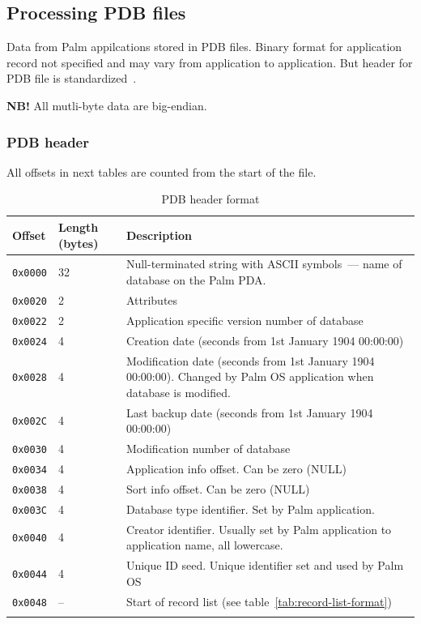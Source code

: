 \documentclass[a4paper,12pt,oneside]{scrartcl}
\begin{document}
\subsection{Processing PDB files}
\label{sec:parsing-pdb-files}

Data from Palm appilcations stored in PDB files. Binary format for application
record not specified and may vary from application to application. But header
for PDB file is standardized~\cite{PalmFileFormatSpec}.

\textbf{NB!} All mutli-byte data are big-endian.

\subsubsection{PDB header}
\label{sec:pdb-header}

All offsets in next tables are counted from the start of the file.

\begin{longtable}{|p{2cm}|p{4cm}|p{7cm}|}
  \hline
  \textbf{Offset} & \textbf{Length (bytes)} & \textbf{Description} \\
  \hline
  \texttt{0x0000} & 32 & Null-terminated string with ASCII symbols~--- name of database on the Palm PDA. \\
  \hline
  \texttt{0x0020} & 2 & Attributes \\
  \hline
  \texttt{0x0022} & 2 & Application specific version number of database \\
  \hline
  \texttt{0x0024} & 4 & Creation date (seconds from 1st January 1904 00:00:00) \\
  \hline
  \texttt{0x0028} & 4 & Modification date (seconds from 1st January 1904 00:00:00). Changed by Palm OS application when database is modified. \\
  \hline
  \texttt{0x002C} & 4 & Last backup date (seconds from 1st January 1904 00:00:00) \\
  \hline
  \texttt{0x0030} & 4 & Modification number of database \\
  \hline
  \texttt{0x0034} & 4 & Application info offset. Can be zero (NULL) \\
  \hline
  \texttt{0x0038} & 4 & Sort info offset. Can be zero (NULL) \\
  \hline
  \texttt{0x003C} & 4 & Database type identifier. Set by Palm application. \\
  \hline
  \texttt{0x0040} & 4 & Creator identifier. Usually set by Palm application to application name, all lowercase. \\
  \hline
  \texttt{0x0044} & 4 & Unique ID seed. Unique identifier set and used by Palm OS \\
  \hline
  \texttt{0x0048} & -- & Start of record list (see table~\ref{tab:record-list-format}) \\
  \hline
  \caption{PDB header format}
  \label{tab:pdb-header-format}
\end{longtable}
\end{document}
